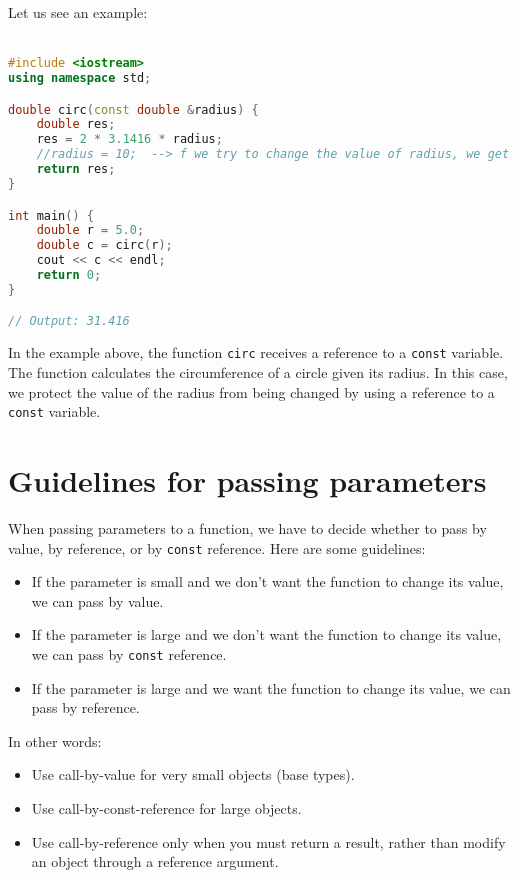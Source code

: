 Let us see an example:\\ \\

\begin{lstlisting}[language=C++]
#include <iostream>
using namespace std;

double circ(const double &radius) {
    double res;
    res = 2 * 3.1416 * radius;
    //radius = 10;  --> f we try to change the value of radius, we get an error 
    return res;
}

int main() {
    double r = 5.0;
    double c = circ(r);
    cout << c << endl;
    return 0;
}

// Output: 31.416
\end{lstlisting}

In the example above, the function \texttt{circ} receives a reference to a
\texttt{const} variable. The function calculates the circumference of a circle
given its radius. In this case, we protect the value of the radius from being
changed by using a reference to a \texttt{const} variable.\\

\section{Guidelines for passing parameters}

When passing parameters to a function, we have to decide whether to pass by
value, by reference, or by \texttt{const} reference. Here are some guidelines:

\begin{itemize}
    \item If the parameter is small and we don't want the function to change its
    value, we can pass by value.
    \item If the parameter is large and we don't want the function to change its
    value, we can pass by \texttt{const} reference.
    \item If the parameter is large and we want the function to change its value,
    we can pass by reference.
\end{itemize}

In other words:

\begin{itemize}
    \item Use call-by-value for very small objects (base types).
    \item Use call-by-const-reference for large objects.
    \item Use call-by-reference only when you must return a result,
    rather than modify an object through a reference argument.
\end{itemize}



